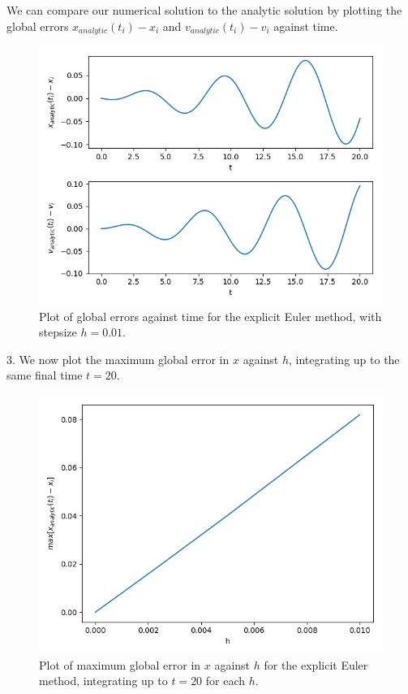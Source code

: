 \documentclass[11pt]{article}
\begin{document}
We can compare our numerical solution to the analytic solution by plotting the global errors $x_{analytic}(t_i) - x_i$ and $v_{analytic}(t_i) - v_i$ against time.
\begin{figure}[htp]
\centering
\includegraphics[scale=0.70]{x_err_and_v_err_plot_1_0_0-01_20.png}
\caption{Plot of global errors against time for the explicit Euler method, with stepsize $h=0.01$.}
\label{expliciterror}
\end{figure}
\newpage

3. We now plot the maximum global error in $x$ against $h$, integrating up to the same final time $t = 20$.
\begin{figure}[htp]
\centering
\includegraphics[scale=0.70]{err_behavior_0-01_4_20.png}
\caption{Plot of maximum global error in $x$ against $h$ for the explicit Euler method, integrating up to $t=20$ for each $h$.}
\label{expliciterrbehavior}
\end{figure}
\end{document}
